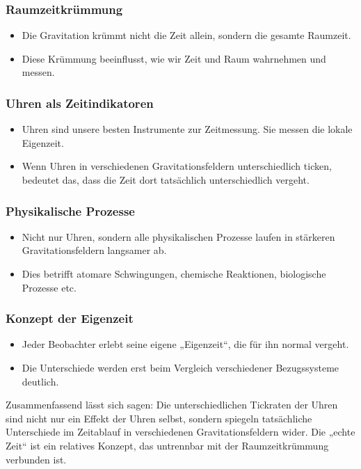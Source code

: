 \documentclass[a4paper,12pt]{article}
\begin{document}
	\subsubsection{Raumzeitkrümmung}
	\begin{itemize}
		\item Die Gravitation krümmt nicht die Zeit allein, sondern die gesamte Raumzeit.
		\item Diese Krümmung beeinflusst, wie wir Zeit und Raum wahrnehmen und messen.
	\end{itemize}
	
	\subsubsection{Uhren als Zeitindikatoren}
	\begin{itemize}
		\item Uhren sind unsere besten Instrumente zur Zeitmessung. Sie messen die lokale Eigenzeit.
		\item Wenn Uhren in verschiedenen Gravitationsfeldern unterschiedlich ticken, bedeutet das, dass die Zeit dort tatsächlich unterschiedlich vergeht.
	\end{itemize}
	
	\subsubsection{Physikalische Prozesse}
	\begin{itemize}
		\item Nicht nur Uhren, sondern alle physikalischen Prozesse laufen in stärkeren Gravitationsfeldern langsamer ab.
		\item Dies betrifft atomare Schwingungen, chemische Reaktionen, biologische Prozesse etc.
	\end{itemize}
	
	\subsubsection{Konzept der Eigenzeit}
	\begin{itemize}
		\item Jeder Beobachter erlebt seine eigene „Eigenzeit“, die für ihn normal vergeht.
		\item Die Unterschiede werden erst beim Vergleich verschiedener Bezugssysteme deutlich.
	\end{itemize}
	
	Zusammenfassend lässt sich sagen: Die unterschiedlichen Tickraten der Uhren sind nicht nur ein Effekt der Uhren selbst, sondern spiegeln tatsächliche Unterschiede im Zeitablauf in verschiedenen Gravitationsfeldern wider. Die „echte Zeit“ ist ein relatives Konzept, das untrennbar mit der Raumzeitkrümmung verbunden ist.
	
\end{document}
